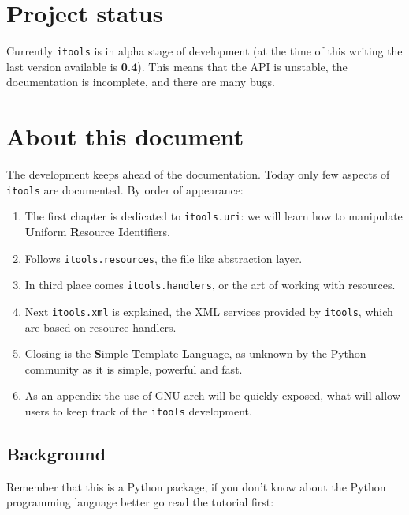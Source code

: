 \section{Project status}

Currently {\tt itools} is in alpha stage of development (at the time of
this writing the last version available is {\bf 0.4}). This means that the
API is unstable, the documentation is incomplete, and there are many bugs.


\section{About this document}

The development keeps ahead of the documentation. Today only few aspects
of {\tt itools} are documented. By order of appearance:

\begin{enumerate}
  \item The first chapter is dedicated to {\tt itools.uri}: we will learn how
    to manipulate {\bf U}niform {\bf R}esource {\bf I}dentifiers.

  \item Follows {\tt itools.resources}, the file like abstraction layer.

  \item In third place comes {\tt itools.handlers}, or the art of working
    with resources.

  \item Next {\tt itools.xml} is explained, the XML services provided by
    {\tt itools}, which are based on resource handlers.

  \item Closing is the {\bf S}imple {\bf T}emplate {\bf L}anguage, as unknown
    by the Python community as it is simple, powerful and fast.

  \item As an appendix the use of GNU arch will be quickly exposed, what
    will allow users to keep track of the {\tt itools} development.
\end{enumerate}


\subsection{Background}

Remember that this is a Python package, if you don't know about the Python
programming language better go read the tutorial first:


